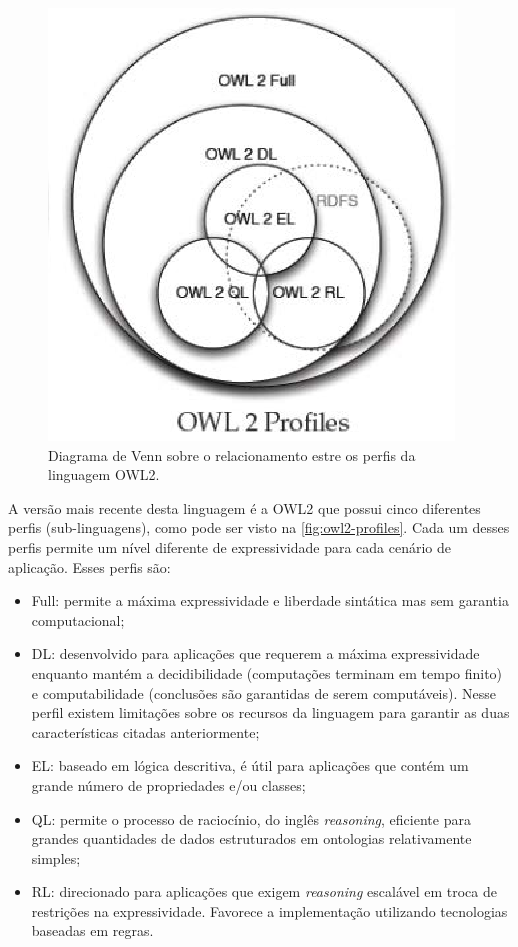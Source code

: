         \begin{figure}[htbp]
        	\centering
            \caption{Diagrama de Venn sobre o relacionamento estre os perfis da linguagem OWL2.}
            \label{fig:owl2-profiles}
            \includegraphics[width=0.7\linewidth]{images/owl2-profiles}
        \end{figure}
        
        A versão mais recente desta linguagem é a OWL2 que possui cinco diferentes perfis (sub-linguagens), como pode ser visto na \autoref{fig:owl2-profiles}. Cada um desses perfis permite um nível diferente de expressividade para cada cenário de aplicação. Esses perfis são:
        
        \begin{itemize}
        	\item Full: permite a máxima expressividade e liberdade sintática mas sem garantia computacional;
            \item DL: desenvolvido para aplicações que requerem a máxima expressividade enquanto mantém a decidibilidade (computações terminam em tempo finito) e computabilidade (conclusões são garantidas de serem computáveis). Nesse perfil existem limitações sobre os recursos da linguagem para garantir as duas características citadas anteriormente;
            \item EL: baseado em lógica descritiva, é útil para aplicações que contém um grande número de propriedades e/ou classes;
            \item QL: permite o processo de raciocínio, do inglês \textit{reasoning}, eficiente para grandes quantidades de dados estruturados em ontologias relativamente simples;
            \item RL: direcionado para aplicações que exigem \textit{reasoning} escalável em troca de restrições na expressividade. Favorece a implementação utilizando tecnologias baseadas em regras.
        \end{itemize}
